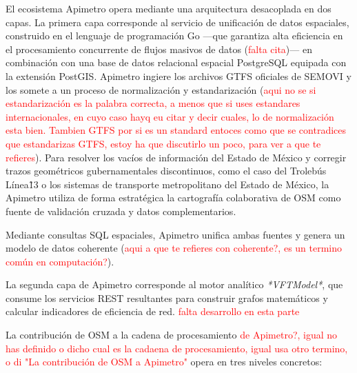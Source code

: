 \documentclass{isprs} %
\begin{document}
El ecosistema Apimetro opera mediante una arquitectura desacoplada en dos capas.  La primera capa corresponde al servicio de unificación de datos espaciales, construido en el lenguaje de programación Go ---que garantiza alta eficiencia en el procesamiento concurrente de flujos masivos de datos (\textcolor{red}{falta cita})--- en combinación con una base de datos relacional espacial PostgreSQL equipada con la extensión PostGIS.  Apimetro ingiere los archivos GTFS oficiales de SEMOVI y los somete a un proceso de normalización y estandarización (\textcolor{red}{aqui no se si estandarización es la palabra correcta, a menos que si uses estandares internacionales, en cuyo caso hayq eu citar y decir cuales, lo de normalización esta bien. Tambien GTFS por si es un standard entoces como que se contradices que estandarizas GTFS, estoy ha que discutirlo un poco, para ver a que te refieres}).  Para resolver los vacíos de información del Estado de México y corregir trazos geométricos gubernamentales discontinuos, como el caso del Trolebús Línea\~13 o los sistemas de transporte metropolitano del Estado de México, la Apimetro utiliza de forma estratégica la cartografía colaborativa de OSM como fuente de validación cruzada y datos complementarios.

Mediante consultas SQL espaciales, Apimetro unifica ambas fuentes y genera un modelo de datos coherente (\textcolor{red}{aqui a que te refieres con coherente?, es un termino común en computación?}).

La segunda capa de Apimetro corresponde al motor analítico \textit{*VFTModel*}, que consume los servicios REST resultantes para construir grafos matemáticos y calcular indicadores de eficiencia de red. \textcolor{red}{falta desarrollo en esta parte}

La contribución de OSM a la cadena de procesamiento \textcolor{red}{de Apimetro?, igual no has definido o dicho cual es la cadaena de procesamiento, igual usa otro termino, o di "La contribución de OSM a Apimetro"} opera en tres niveles concretos:
\end{document}
